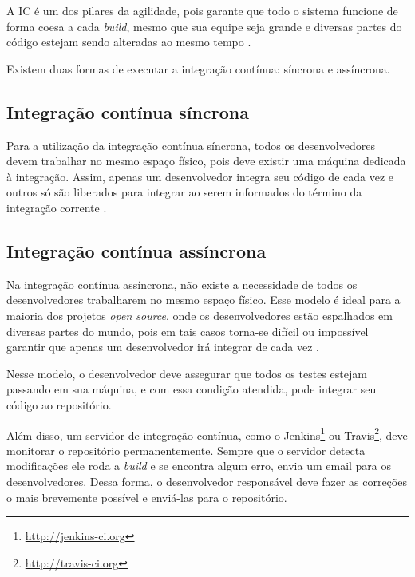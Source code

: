 A IC é um dos pilares da agilidade, pois garante que todo o sistema funcione de forma coesa a cada \textit{build}, mesmo que sua equipe seja grande e diversas partes do código estejam sendo alteradas ao mesmo tempo \cite{CaelumCI}.

Existem duas formas de executar a integração contínua: síncrona e assíncrona.

\subsection{Integração contínua síncrona} %
\label{sub:integracao_continua_sincrona}

Para a utilização da integração contínua síncrona, todos os desenvolvedores devem trabalhar no mesmo espaço físico, pois deve existir uma máquina dedicada à integração. Assim, apenas um desenvolvedor integra seu código de cada vez e outros só são liberados para integrar ao serem informados do término da integração corrente \cite{ImproveitCI}.



\subsection{Integração contínua assíncrona} %
\label{sub:integracao_continua_assincrona}

Na integração contínua assíncrona, não existe a necessidade de todos os desenvolvedores trabalharem no mesmo espaço físico. Esse modelo é ideal para a maioria dos projetos \textit{open source}, onde os desenvolvedores estão espalhados em diversas partes do mundo, pois em tais casos torna-se difícil ou impossível garantir que apenas um desenvolvedor irá integrar de cada vez \cite{ImproveitCI}.

Nesse modelo, o desenvolvedor deve assegurar que todos os testes estejam passando em sua máquina, e com essa condição atendida, pode integrar seu código ao repositório.

Além disso, um servidor de integração contínua, como o Jenkins\footnote{\url{http://jenkins-ci.org}} ou Travis\footnote{\url{http://travis-ci.org}}, deve monitorar o repositório permanentemente. Sempre que o servidor detecta modificações ele roda a \textit{build} e se encontra algum erro, envia um email para os desenvolvedores. Dessa forma, o desenvolvedor responsável deve fazer as correções o mais brevemente possível e enviá-las para o repositório.

